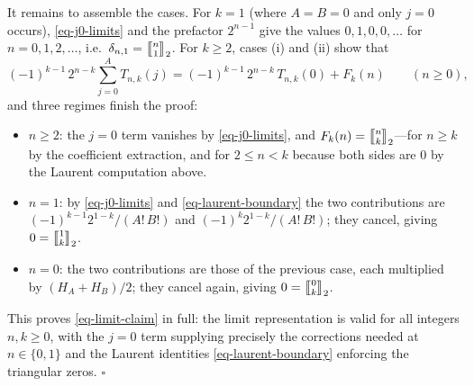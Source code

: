 \documentclass[a4paper]{amsart}
\numberwithin{equation}{section}
\newcommand{\mStirling}[0]{\genfrac{\llbracket}{\rrbracket}{0pt}{}}
\begin{document}
It remains to assemble the cases. For $k = 1$ (where $A = B = 0$ and only $j = 0$ occurs), \eqref{eq-j0-limits} and the prefactor $2^{n-1}$ give the values $0, 1, 0, 0, \ldots$ for $n = 0, 1, 2, \ldots$, i.e.\ $\delta_{n,1} = \mStirling{n}{1}_2$. For $k \geq 2$, cases (i) and (ii) show that
\[
(-1)^{k-1}\, 2^{n-k} \sum_{j=0}^{A} T_{n,k}(j) = (-1)^{k-1}\,2^{n-k}\,T_{n,k}(0) + F_k(n) \qquad (n \geq 0),
\]
and three regimes finish the proof:
\begin{itemize}
    \renewcommand\labelitemi{--}
    \item $n \geq 2$: the $j = 0$ term vanishes by \eqref{eq-j0-limits}, and $F_k(n) = \mStirling{n}{k}_2$---for $n \geq k$ by the coefficient extraction, and for $2 \leq n < k$ because both sides are $0$ by the Laurent computation above.
    \item $n = 1$: by \eqref{eq-j0-limits} and \eqref{eq-laurent-boundary} the two contributions are $(-1)^{k-1}2^{1-k}/(A!\,B!)$ and $(-1)^{k}2^{1-k}/(A!\,B!)$; they cancel, giving $0 = \mStirling{1}{k}_2$.
    \item $n = 0$: the two contributions are those of the previous case, each multiplied by $(H_A + H_B)/2$; they cancel again, giving $0 = \mStirling{0}{k}_2$.
\end{itemize}
This proves \eqref{eq-limit-claim} in full: the limit representation is valid for all integers $n, k \geq 0$, with the $j = 0$ term supplying precisely the corrections needed at $n \in \{0, 1\}$ and the Laurent identities \eqref{eq-laurent-boundary} enforcing the triangular zeros. \hfill $\square$

\newpage
\end{document}
